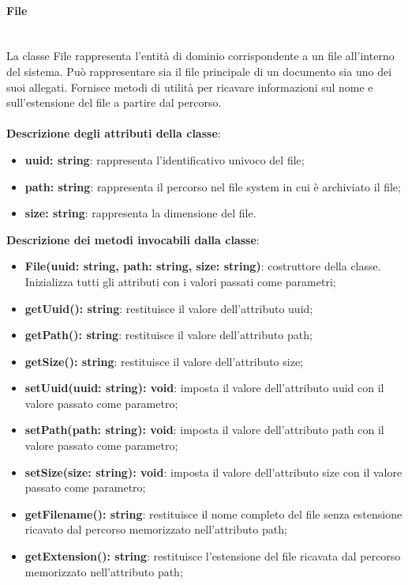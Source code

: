 \documentclass[a4paper,12pt]{article}
\begin{document}
{                \paragraph{File}\label{par:File}\mbox{}\\
                La classe File rappresenta l'entità di dominio corrispondente a un file all'interno del sistema. Può rappresentare sia il file principale di un documento sia uno dei suoi allegati. Fornisce metodi di utilità per ricavare informazioni sul nome e sull'estensione del file a partire dal percorso.\\
                \\
                \textbf{Descrizione degli attributi della classe}:
                \begin{itemize}
                    \item \textbf{uuid: string}: rappresenta l'identificativo univoco del file;
                    \item \textbf{path: string}: rappresenta il percorso nel file system in cui è archiviato il file;
                    \item \textbf{size: string}: rappresenta la dimensione del file.
                \end{itemize}
 
              \noindent \textbf{Descrizione dei metodi invocabili dalla classe}:
                \begin{itemize}
                    \item \textbf{File(uuid: string, path: string, size: string)}: costruttore della classe. Inizializza tutti gli attributi con i valori passati come parametri;
                    \item \textbf{getUuid(): string}: restituisce il valore dell'attributo uuid;
                    \item \textbf{getPath(): string}: restituisce il valore dell'attributo path;
                    \item \textbf{getSize(): string}: restituisce il valore dell'attributo size;
                    \item \textbf{setUuid(uuid: string): void}: imposta il valore dell'attributo uuid con il valore passato come parametro;
                    \item \textbf{setPath(path: string): void}: imposta il valore dell'attributo path con il valore passato come parametro;
                    \item \textbf{setSize(size: string): void}: imposta il valore dell'attributo size con il valore passato come parametro;
                    \item \textbf{getFilename(): string}: restituisce il nome completo del file senza estensione ricavato dal percorso memorizzato nell'attributo path;
                    \item \textbf{getExtension(): string}: restituisce l'estensione del file ricavata dal percorso memorizzato nell'attributo path;
                \end{itemize}
 
}
\end{document}
